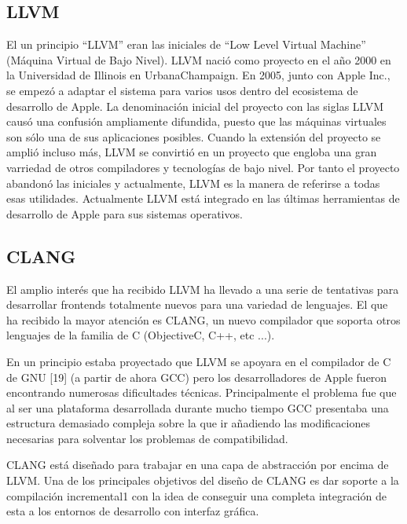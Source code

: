 \subsection{LLVM}

El un principio ``LLVM'' eran las iniciales de ``Low Level Virtual Machine'' (M\'aquina Virtual de Bajo Nivel). LLVM naci\'o como proyecto en el a\~no 2000 en la Universidad de Illinois en UrbanaChampaign. En 2005, junto con Apple Inc., se empez\'o a adaptar el sistema para varios usos dentro del ecosistema de desarrollo de Apple. La denominaci\'on inicial del proyecto con las siglas LLVM caus\'o una confusi\'on ampliamente difundida, puesto que las m\'aquinas virtuales son s\'olo una de sus aplicaciones posibles. Cuando la extensi\'on del proyecto se ampli\'o incluso m\'as, LLVM se convirti\'o en un proyecto que engloba una gran varriedad de otros compiladores y tecnolog\'ias de bajo nivel. Por tanto el proyecto abandon\'o las iniciales y actualmente, LLVM es la manera de referirse a todas esas utilidades. Actualmente LLVM est\'a integrado en las \'ultimas herramientas de desarrollo de Apple para sus sistemas operativos.

\subsection{CLANG}

El amplio inter\'es que ha recibido LLVM ha llevado a una serie de tentativas para desarrollar frontends totalmente nuevos para una variedad de lenguajes. El que ha recibido la mayor atenci\'on es CLANG, un nuevo compilador que soporta otros lenguajes de la familia de C (ObjectiveC, C++, etc ...).

En un principio estaba proyectado que LLVM se apoyara en el compilador de C de GNU [19] (a partir de ahora GCC) pero los desarrolladores de Apple fueron encontrando numerosas dificultades t\'ecnicas. Principalmente el problema fue que al ser una plataforma desarrollada durante mucho tiempo GCC presentaba una estructura demasiado compleja sobre la que ir a\~nadiendo las modificaciones necesarias para solventar los problemas de compatibilidad.

CLANG est\'a dise\~nado para trabajar en una capa de abstracci\'on por encima de LLVM. Una de los principales objetivos del dise\~no de CLANG es dar soporte a la compilaci\'on incremental1 con la idea de conseguir una completa integraci\'on de esta a los entornos de desarrollo con interfaz gr\'afica.

